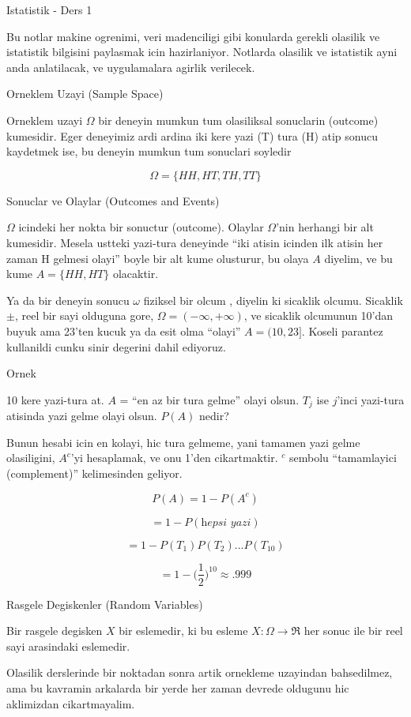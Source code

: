 \documentclass[12pt,fleqn]{article}
\begin{document}
Istatistik - Ders 1

Bu notlar makine ogrenimi, veri madenciligi gibi konularda gerekli olasilik
ve istatistik bilgisini paylasmak icin hazirlaniyor. Notlarda olasilik ve
istatistik ayni anda anlatilacak, ve uygulamalara agirlik verilecek. 

Orneklem Uzayi (Sample Space)

Orneklem uzayi $\Omega$ bir deneyin mumkun tum olasiliksal sonuclarin
(outcome) kumesidir. Eger deneyimiz ardi ardina iki kere yazi (T) tura (H)
atip sonucu kaydetmek ise, bu deneyin mumkun tum sonuclari soyledir

\[\Omega = \{HH,HT,TH,TT\} \]

Sonuclar ve Olaylar (Outcomes and Events)

$\Omega$ icindeki her nokta bir sonuctur (outcome). Olaylar $\Omega$'nin
herhangi bir alt kumesidir. Mesela ustteki yazi-tura deneyinde ``iki atisin
icinden ilk atisin her zaman H gelmesi olayi'' boyle bir alt kume
olusturur, bu olaya $A$ diyelim, ve bu kume $A = \{HH,HT\}$ olacaktir. 

Ya da bir deneyin sonucu $\omega$ fiziksel bir olcum , diyelin ki sicaklik
olcumu. Sicaklik $\pm$, reel bir sayi olduguna gore, $\Omega = (-\infty,
+\infty)$, ve
sicaklik olcumunun 10'dan buyuk ama 23'ten kucuk ya da esit
olma ``olayi'' $A = (10,23]$. Koseli parantez kullanildi cunku sinir
degerini dahil ediyoruz. 

Ornek 

10 kere yazi-tura at. $A$ = ``en az bir tura gelme'' olayi olsun. $T_j$ ise
$j$'inci yazi-tura atisinda yazi gelme olayi olsun. $P(A)$ nedir? 

Bunun hesabi icin en kolayi, hic tura gelmeme, yani tamamen yazi gelme
olasiligini, $A^c$'yi hesaplamak, ve onu 1'den cikartmaktir. $^c$ sembolu
``tamamlayici (complement)'' kelimesinden geliyor.

\[ P(A) = 1 - P(A^c) \]

\[ = 1 - P(\textit{hepsi yazi}) \]

\[ = 1-P(T_1)P(T_2)...P(T_{10}) \]

\[ = 1 - \bigg(\frac{1}{2}\bigg)^{10} \approx .999 \]


Rasgele Degiskenler (Random Variables)

Bir rasgele degisken $X$ bir eslemedir, ki bu esleme $X: \Omega \to \Re$
her sonuc ile bir reel sayi arasindaki eslemedir. 

Olasilik derslerinde bir noktadan sonra artik ornekleme uzayindan
bahsedilmez, ama bu kavramin arkalarda bir yerde her zaman devrede oldugunu
hic aklimizdan cikartmayalim. 
\end{document}
